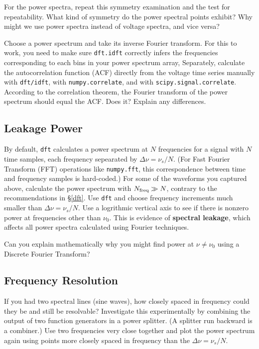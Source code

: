 \documentclass[11pt,preprint]{aastex}
\begin{document}
For the power spectra, repeat this symmetry examination and the test for
repeatability. What kind of symmetry do the power spectral points
exhibit? Why might we use power spectra instead of voltage spectra, and vice versa?

Choose a power spectrum and take its inverse Fourier transform.
For this to work, you need to make sure {\tt dft.idft} correctly infers
the frequencies corresponding to each bins in your power spectrum array,
Separately, calculate the autocorrelation function (ACF) directly from 
the voltage time series manually with {\tt dft/idft}, with \verb$numpy.correlate$, and with \verb$scipy.signal.correlate$.
According to the correlation theorem, the Fourier transform
of the power spectrum should equal the ACF. Does it? Explain any differences.

\subsection{Leakage Power} \label{subleakage}

\noindent
By default, \verb$dft$ calculates a power spectrum at $N$ frequencies for a signal with 
$N$ time samples, each frequency sepearated by $\Delta\nu = \nu_s/N$. (For Fast Fourier Transform (FFT)
operations like \verb$numpy.fft$, this correspondence between time and frequency samples is hard-coded.) 
For some of the waveforms you captured above, calculate
the power spectrum with $N_{\rm freq}\gg N$, contrary to the
recommendations in \S \ref{dft}. Use \verb$dft$ and choose 
frequency increments much smaller than $\Delta \nu = \nu_s/N$.
Use a logrithmic vertical axis to see if there is nonzero power at
frequencies other than $\nu_0$.  This
is evidence of {\bf spectral leakage}, which affects all power spectra 
calculated using Fourier techniques. 

Can you explain mathematically why you might find power at $\nu\ne\nu_0$ using a Discrete Fourier Transform?

\subsection{Frequency Resolution} \label{freqres}

\noindent
If you had two spectral lines (sine waves), how closely spaced in frequency
could they be and still be resolvable? Investigate this experimentally by
combining the output of two function generators in a power splitter. (A splitter
run backward is a combiner.) Use two 
frequencies very close together and plot the power spectrum again
using points more closely spaced in frequency
than the $\Delta \nu = \nu_s/N$.
\end{document}
